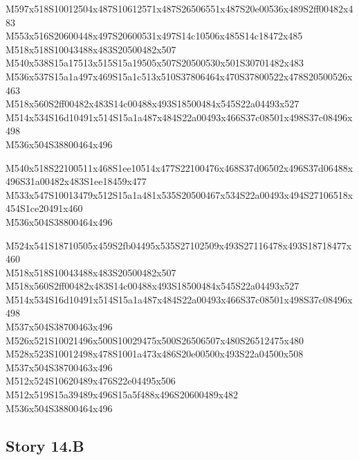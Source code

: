 \documentclass{article}
\begin{document}
\begin{multicols}{5}
\begin{center}
M597x518S10012504x487S10612571x487S26506551x487S20e00536x489S2ff00482x483 %
\\M553x516S20600448x497S20600531x497S14c10506x485S14c18472x485 %
\\M518x518S10043488x483S20500482x507 %
\\M540x538S15a17513x515S15a19505x507S20500530x501S30701482x483 %
\\M536x537S15a1a497x469S15a1c513x510S37806464x470S37800522x478S20500526x463 %
\\M518x560S2ff00482x483S14c00488x493S18500484x545S22a04493x527 %
\\M514x534S16d10491x514S15a1a487x484S22a00493x466S37c08501x498S37c08496x498 %
\\M536x504S38800464x496 %

M540x518S22100511x468S1ee10514x477S22100476x468S37d06502x496S37d06488x496S31a00482x483S1ee18459x477 %
\\M533x547S10013479x512S15a1a481x535S20500467x534S22a00493x494S27106518x454S1ce20491x460 %
\\M536x504S38800464x496 %

M524x541S18710505x459S2fb04495x535S27102509x493S27116478x493S18718477x460 %
\\M518x518S10043488x483S20500482x507 %
\\M518x560S2ff00482x483S14c00488x493S18500484x545S22a04493x527 %
\\M514x534S16d10491x514S15a1a487x484S22a00493x466S37c08501x498S37c08496x498 %
\\M537x504S38700463x496 %
\\M526x521S10021496x500S10029475x500S26506507x480S26512475x480 %
\\M528x523S10012498x478S1001a473x486S20e00500x493S22a04500x508 %
\\M537x504S38700463x496 %
\\M512x524S10620489x476S22e04495x506 %
\\M512x519S15a39489x496S15a5f488x496S20600489x482 %
\\M536x504S38800464x496 %

\end{center}
\end{multicols}

\subsection{Story 14.B}
\end{document}
